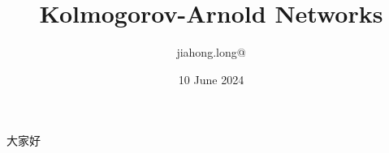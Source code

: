 \documentclass[UTF8]{beamer}
\title{\bf Kolmogorov-Arnold Networks}
\author{jiahong.long@}
\institute{Cruise $\cdot$ UC San Diego}
\date{10 June 2024}
\begin{document}
\frame{\titlepage}

\begin{frame}
\end{frame}
\begin{frame}
    大家好
\end{frame}
\end{document}
